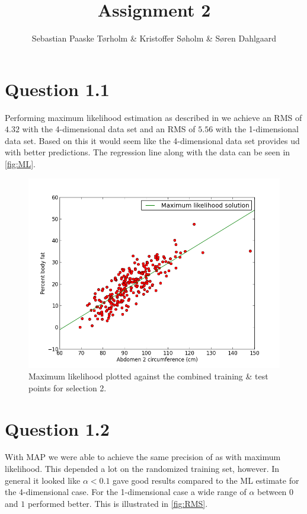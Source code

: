 \documentclass[11pt,a4paper]{article}
\title{Assignment 2}
\author{Sebastian Paaske Tørholm \& Kristoffer Søholm \& Søren Dahlgaard}
\begin{document}
\maketitle

\section{Question 1.1}
Performing maximum likelihood estimation as described in
\cite[sec. 3.1.1]{Bishop} we achieve an RMS of $4.32$ with the 4-dimensional
data set and an RMS of $5.56$ with the 1-dimensional data set. Based on this
it would seem like the 4-dimensional data set provides ud with better
predictions. The regression line along with the data can be seen in
\autoref{fig:ML}.

\begin{figure}[htbp]
    \includegraphics[width=\textwidth]{images/prob11-sel2.png}
    \caption{Maximum likelihood plotted against the combined training \& test
    points for selection 2.}
    \label{fig:ML}
\end{figure}

\section{Question 1.2}
With MAP we were able to achieve the same precision of as with maximum
likelihood. This depended a lot on the randomized training set, however. In
general it looked like $\alpha < 0.1$ gave good results compared to the ML
estimate for the 4-dimensional case. For the 1-dimensional case a wide range
of $\alpha$ between $0$ and $1$ performed better. This is illustrated in
\autoref{fig:RMS}.
\end{document}
